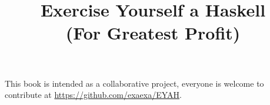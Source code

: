 \documentclass[10pt,a5paper]{book}
\title{Exercise Yourself a Haskell \\ \vspace{1em} \Large (For Greatest Profit)}
\date{}
\begin{document}
\maketitle
This book is intended as a collaborative project, everyone is welcome to
contribute at \url{https://github.com/exaexa/EYAH}.
\end{document}
